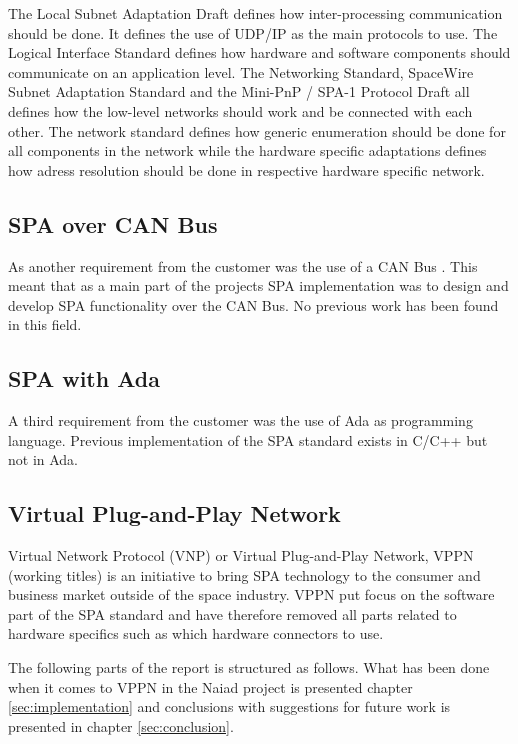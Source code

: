 The Local Subnet Adaptation Draft defines how inter-processing communication
should be done. It defines the use of UDP/IP as the main protocols to use. The
Logical Interface Standard defines how hardware and software components should
communicate on an application level. The Networking Standard, SpaceWire Subnet
Adaptation Standard and the Mini-PnP / SPA-1 Protocol Draft all defines how the
low-level networks should work and be connected with each other. The network
standard defines how generic enumeration should be done for all components in
the network while the hardware specific adaptations defines how adress
resolution should be done in respective hardware specific network.

\subsection{SPA over CAN Bus}
As another requirement from the customer was the use of a CAN Bus
\cite{standard:can_bus}. This meant that as a main part of the projects
SPA implementation was to design and develop SPA functionality over the CAN
Bus. No previous work has been found in this field.

\subsection{SPA with Ada}
A third requirement from the customer was the use of Ada as programming
language. Previous implementation of the SPA standard exists in C/C++ but not
in Ada.

\subsection{Virtual Plug-and-Play Network}
Virtual Network Protocol (VNP) \cite{web:vnp} or Virtual Plug-and-Play
Network, VPPN (working titles) is an initiative to bring SPA technology to
the consumer and business market outside of the space industry. VPPN put focus
on the software part of the SPA standard and have therefore removed all parts
related to hardware specifics such as which hardware connectors to use.

The following parts of the report is structured as follows. What has been done
when it comes to VPPN in the Naiad project is presented chapter
\ref{sec:implementation} and conclusions with suggestions for future work is
presented in chapter \ref{sec:conclusion}.

